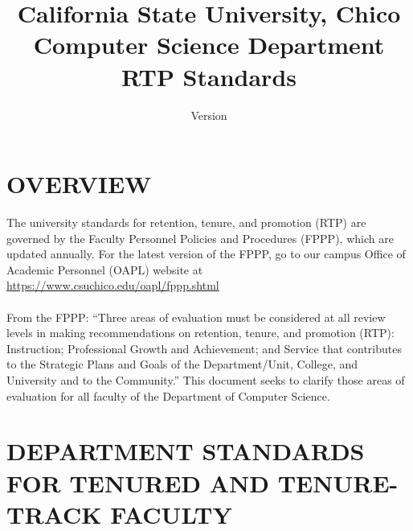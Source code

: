 \documentclass{scrartcl}
\title{California State University, Chico\\Computer Science Department\\RTP Standards}
\subtitle{Version \version}
\def\version{1.3}
\begin{document}
\fancyhead{}\fancyfoot{}
\begin{titlepage}
\clearpage\maketitle
\thispagestyle{empty}

\end{titlepage}



{
}
\fancyhead[R]{\fontsize{8}{12} \selectfont Revised: \today\\ v\version}

\setlength{\parindent}{0pt}

\tableofcontents

\pagebreak

\section{OVERVIEW}

The university standards for retention, tenure, and promotion (RTP) are governed by the Faculty Personnel Policies and Procedures (FPPP), which are updated annually. For the latest version of the FPPP, go to our campus Office of Academic Personnel (OAPL) website at \href{https://www.csuchico.edu/oapl/fppp.shtml}{https://www.csuchico.edu/oapl/fppp.shtml}
\\\\
From the FPPP: “Three areas of evaluation must be considered at all review levels in making recommendations on retention, tenure, and promotion (RTP): Instruction; Professional Growth and Achievement; and Service that contributes to the Strategic Plans and Goals of the Department/Unit, College, and University and to the Community.” This document seeks to clarify those areas of evaluation for all faculty of the Department of Computer Science.

 \thispagestyle{firststyle}

\section{DEPARTMENT STANDARDS FOR TENURED AND TENURE-TRACK FACULTY }
\end{document}
